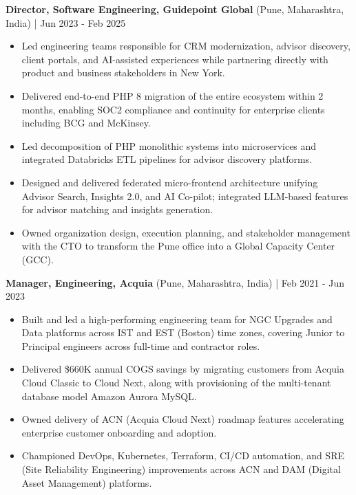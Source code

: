 \documentclass[11pt,a4paper]{article}
\begin{document}
\textbf{Director, Software Engineering, Guidepoint Global} (Pune, Maharashtra, India) | Jun 2023 - Feb 2025 \\
\begin{itemize}[leftmargin=*]
    \item Led engineering teams responsible for CRM modernization, advisor discovery, client portals, and AI-assisted experiences while partnering directly with product and business stakeholders in New York.
    \item Delivered end-to-end PHP 8 migration of the entire ecosystem within 2 months, enabling SOC2 compliance and continuity for enterprise clients including BCG and McKinsey.
    \item Led decomposition of PHP monolithic systems into microservices and integrated Databricks ETL pipelines for advisor discovery platforms.
    \item Designed and delivered federated micro-frontend architecture unifying Advisor Search, Insights 2.0, and AI Co-pilot; integrated LLM-based features for advisor matching and insights generation.
    \item Owned organization design, execution planning, and stakeholder management with the CTO to transform the Pune office into a Global Capacity Center (GCC).
\end{itemize}

\vspace{4pt}

\textbf{Manager, Engineering, Acquia} (Pune, Maharashtra, India) | Feb 2021 - Jun 2023 \\
\begin{itemize}[leftmargin=*]
    \item Built and led a high-performing engineering team for NGC Upgrades and Data platforms across IST and EST (Boston) time zones, covering Junior to Principal engineers across full-time and contractor roles.
    \item Delivered \$660K annual COGS savings by migrating customers from Acquia Cloud Classic to Cloud Next, along with provisioning of the multi-tenant database model Amazon Aurora MySQL.
    \item Owned delivery of ACN (Acquia Cloud Next) roadmap features accelerating enterprise customer onboarding and adoption.
    \item Championed DevOps, Kubernetes, Terraform, CI/CD automation, and SRE (Site Reliability Engineering) improvements across ACN and DAM (Digital Asset Management) platforms.
\end{itemize}
\end{document}
